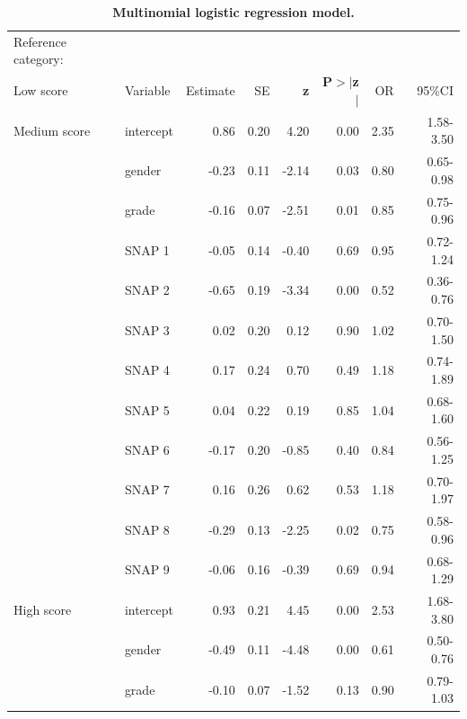\documentclass[10pt,letterpaper]{article}
\begin{document}
  

\vspace{5mm}

\begin{table}[H]
\centering
\caption{\bf Multinomial logistic regression model.} 
\begin{tabular}{|llrrrr|rr|}
  \hline
Reference category: &&&&&&&\\
Low score & Variable &Estimate & SE & \textbf{z} & \textbf{P$>$$|$z$|$} &  OR &  95\%CI\\ 
 \hline
  \hline
Medium score & intercept  & 0.86 & 0.20 & 4.20 & 0.00 & 2.35 & 1.58-3.50 \\ 
\hline
  & gender & -0.23 & 0.11 & -2.14 & 0.03 & 0.80 & 0.65-0.98 \\ 
 \hline
  & grade & -0.16 & 0.07 & -2.51 & 0.01& 0.85 & 0.75-0.96 \\ 
 \hline
  & SNAP 1 & -0.05 & 0.14 & -0.40 & 0.69 & 0.95 & 0.72-1.24 \\ 
  \hline
  & SNAP 2 & -0.65 & 0.19 & -3.34 & 0.00 & 0.52 & 0.36-0.76 \\ 
  \hline
  & SNAP 3 & 0.02 & 0.20 & 0.12 & 0.90 & 1.02 & 0.70-1.50 \\ 
  \hline
  & SNAP 4 & 0.17 & 0.24 & 0.70 & 0.49 & 1.18 & 0.74-1.89 \\ 
  \hline
  & SNAP 5 & 0.04 & 0.22 & 0.19 & 0.85 & 1.04 & 0.68-1.60 \\ 
  \hline
  & SNAP 6 & -0.17 & 0.20 & -0.85 & 0.40 &  0.84 & 0.56-1.25 \\ 
   \hline
  & SNAP 7 & 0.16 & 0.26 & 0.62 & 0.53 & 1.18 & 0.70-1.97 \\ 
  \hline
  & SNAP 8 & -0.29 & 0.13 & -2.25 & 0.02 & 0.75 & 0.58-0.96 \\ 
  \hline
  & SNAP 9 & -0.06 & 0.16 & -0.39 & 0.69 & 0.94 & 0.68-1.29 \\ 
   \hline
   \hline
   High score & intercept & 0.93 & 0.21 & 4.45 & 0.00 & 2.53 & 1.68-3.80 \\ 
  \hline
  & gender & -0.49 & 0.11 & -4.48 & 0.00 & 0.61 & 0.50-0.76 \\ 
 \hline
 & grade & -0.10 & 0.07 & -1.52 & 0.13 & 0.90 & 0.79-1.03 \\ 

\end{tabular}
\end{table}
\end{document}
